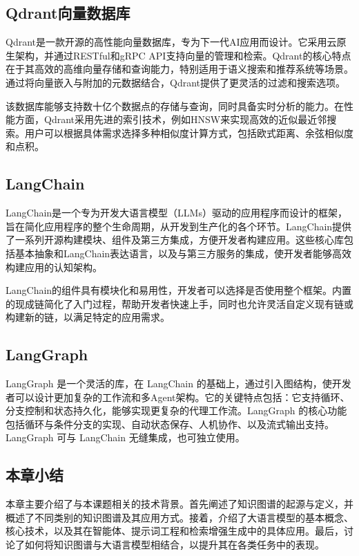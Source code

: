 \subsection{Qdrant向量数据库}

Qdrant是一款开源的高性能向量数据库，专为下一代AI应用而设计。它采用云原生架构，并通过RESTful和gRPC API支持向量的管理和检索。Qdrant的核心特点在于其高效的高维向量存储和查询能力，特别适用于语义搜索和推荐系统等场景。通过将向量嵌入与附加的元数据结合，Qdrant提供了更灵活的过滤和搜索选项。

该数据库能够支持数十亿个数据点的存储与查询，同时具备实时分析的能力。在性能方面，Qdrant采用先进的索引技术，例如HNSW来实现高效的近似最近邻搜索。用户可以根据具体需求选择多种相似度计算方式，包括欧式距离、余弦相似度和点积。

\subsection{LangChain}

LangChain是一个专为开发大语言模型（LLMs）驱动的应用程序而设计的框架，旨在简化应用程序的整个生命周期，从开发到生产化的各个环节。LangChain提供了一系列开源构建模块、组件及第三方集成，方便开发者构建应用。这些核心库包括基本抽象和LangChain表达语言，以及与第三方服务的集成，使开发者能够高效构建应用的认知架构。

LangChain的组件具有模块化和易用性，开发者可以选择是否使用整个框架。内置的现成链简化了入门过程，帮助开发者快速上手，同时也允许灵活自定义现有链或构建新的链，以满足特定的应用需求。

\subsection{LangGraph}

LangGraph 是一个灵活的库，在 LangChain 的基础上，通过引入图结构，使开发者可以设计更加复杂的工作流和多Agent架构。它的关键特点包括：它支持循环、分支控制和状态持久化，能够实现更复杂的代理工作流。LangGraph 的核心功能包括循环与条件分支的实现、自动状态保存、人机协作、以及流式输出支持。LangGraph 可与 LangChain 无缝集成，也可独立使用。

\subsection{本章小结}
本章主要介绍了与本课题相关的技术背景。首先阐述了知识图谱的起源与定义，并概述了不同类别的知识图谱及其应用方式。接着，介绍了大语言模型的基本概念、核心技术，以及其在智能体、提示词工程和检索增强生成中的具体应用。最后，讨论了如何将知识图谱与大语言模型相结合，以提升其在各类任务中的表现。